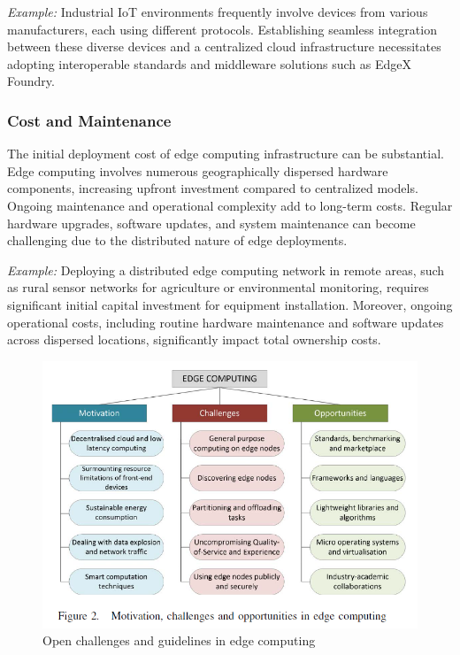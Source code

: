 \documentclass[runningheads]{llncs}
\begin{document}
\textit{Example:} Industrial IoT environments frequently involve devices from various manufacturers, each using different protocols. Establishing seamless integration between these diverse devices and a centralized cloud infrastructure necessitates adopting interoperable standards and middleware solutions such as EdgeX Foundry.

\subsubsection{Cost and Maintenance}
The initial deployment cost of edge computing infrastructure can be substantial. Edge computing involves numerous geographically dispersed hardware components, increasing upfront investment compared to centralized models. Ongoing maintenance and operational complexity add to long-term costs. Regular hardware upgrades, software updates, and system maintenance can become challenging due to the distributed nature of edge deployments.

\textit{Example:} Deploying a distributed edge computing network in remote areas, such as rural sensor networks for agriculture or environmental monitoring, requires significant initial capital investment for equipment installation. Moreover, ongoing operational costs, including routine hardware maintenance and software updates across dispersed locations, significantly impact total ownership costs.

\begin{figure}[ht]
    \centering
    \includegraphics[width=\textwidth]{IMG/10.png}
    \caption{Open challenges and guidelines in edge computing}
    \label{fig:open_challenges_guidelines}
    \end{figure}
\end{document}
